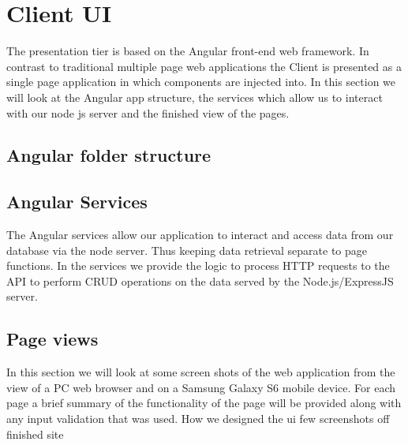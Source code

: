 \section{Client UI}
The presentation tier is based on the Angular front-end web framework. In contrast to traditional multiple page web applications the Client is presented as a single page application in which components are injected into. In this section we will look at the Angular app structure, the services which allow us to interact with our node js server and the finished view of the pages.

\subsection{Angular folder structure}

\subsection{Angular Services}
The Angular services allow our application to interact and access data from our database via the node server. Thus keeping data retrieval separate to page functions. In the services we provide the logic to process HTTP requests to the API to perform CRUD operations on the data served by the Node.js/ExpressJS server. 

\subsection{Page views}
In this section we will look at some screen shots of the web application from the view of a PC web browser and on a Samsung Galaxy S6 mobile device. For each page a brief summary of the functionality of the page will be provided along with any input validation that was used. 
How we designed the ui
few screenshots off finished site

